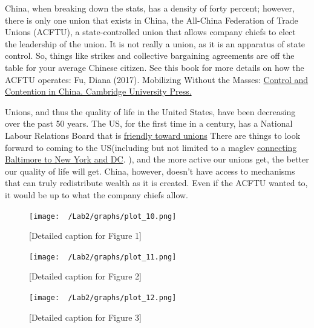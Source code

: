 \documentclass[11pt]{article}\usepackage[]{graphicx}\usepackage[]{xcolor}
\begin{document}
China, when breaking down the stats, has a density of forty percent; however, there is only one union that exists in China, the All-China Federation of Trade Unions (ACFTU), a state-controlled union that allows company chiefs to elect the leadership of the union. It is not really a union, as it is an apparatus of state control. So, things like strikes and collective bargaining agreements are off the table for your average Chinese citizen. See this book for more details on how the ACFTU operates:  Fu, Diana (2017). Mobilizing Without the Masses: \href{https://www.amazon.com/Mobilizing-without-Masses-Contention-Contentious/dp/1108430414}{Control and Contention in China. Cambridge University Press.}

Unions, and thus the quality of life in the United States, have been decreasing over the past 50 years. The US, for the first time in a century, has a National Labour Relations Board that is \href {https://www.theguardian.com/us-news/2023/sep/02/union-nlrb-decision-delays-busting}{friendly toward unions} There are things to look forward to coming to the US(including but not limited to a maglev \href{https://northeastmaglev.com/project/}{connecting Baltimore to New York and DC}. ), and the more active our unions get, the better our quality of life will get. China, however, doesn't have access to mechanisms that can truly redistribute wealth as it is created. Even if the ACFTU wanted to, it would be up to what the company chiefs allow. 




\begin{figure}[h]
\centering
  \begin{minipage}{0.9\linewidth}
  \texttt{[image: ~/Lab2/graphs/plot\_10.png]}
  \caption{[Detailed caption for Figure 1]}
  \label{fig:1.1}
  \end{minipage}
\end{figure}

\begin{figure}[h]
\centering
\begin{minipage}{0.9\linewidth}
  \texttt{[image: ~/Lab2/graphs/plot\_11.png]}
  \caption{[Detailed caption for Figure 2]}
  \label{fig:1.2}
  \end{minipage}
\end{figure}

\begin{figure}[h]
\centering
\begin{minipage}{0.9\linewidth}
  \texttt{[image: ~/Lab2/graphs/plot\_12.png]}
  \caption{[Detailed caption for Figure 3]}
  \label{fig:1.3}
  \end{minipage}
\end{figure}
\end{document}
